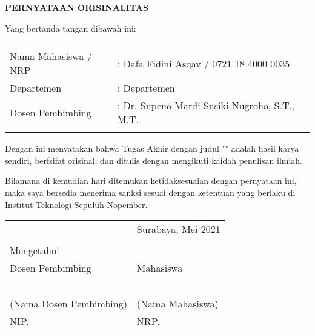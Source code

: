 \begin{center}
  \large
  \textbf{PERNYATAAN ORISINALITAS}
\end{center}

\thispagestyle{empty}

\vspace{2ex}


\noindent Yang bertanda tangan dibawah ini:

\noindent\begin{tabularx}{\textwidth}{X X l}
  & \\
  Nama Mahasiswa / NRP &: Dafa Fidini Asqav / 0721 18 4000 0035 \\
  Departemen &: Departemen \\
  Dosen Pembimbing &: Dr. Supeno Mardi Susiki Nugroho, S.T., M.T.  \\
  & \\
\end{tabularx}

Dengan ini menyatakan bahwa Tugas Akhir dengan judul "" adalah hasil karya sendiri, berfsifat orisinal, dan ditulis dengan mengikuti kaidah penulisan ilmiah.

Bilamana di kemudian hari ditemukan ketidaksesuaian dengan pernyataan ini, maka saya bersedia menerima sanksi sesuai dengan ketentuan yang berlaku di Institut Teknologi Sepuluh Nopember.

\vspace{8ex}

\noindent\begin{tabularx}{\textwidth}{X l}
  & Surabaya, Mei 2021\\
  & \\
  Mengetahui & \\
  Dosen Pembimbing & Mahasiswa\\
  & \\
  & \\
  & \\
  & \\
  & \\
  (Nama Dosen Pembimbing) & (Nama Mahasiswa) \\
  NIP. & NRP. \\
\end{tabularx}